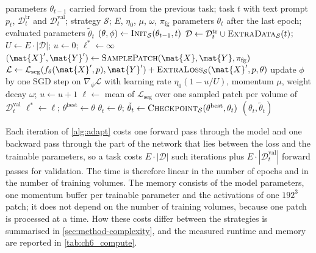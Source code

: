 \begin{algorithm}[tb]
\caption{\textsc{Adapt}: adapting VoxTell to task~$t$. The steps with subscript~$\mathcal{S}$ are where the strategies differ (\cref{sec:method-strategies}).}
\label{alg:adapt}
\begin{algorithmic}[1]
\REQUIRE parameters $\theta_{t-1}$ carried forward from the previous task; task $t$ with text prompt $p_t$, $\mathcal{D}_t^{\mathrm{tr}}$ and $\mathcal{D}_t^{\mathrm{val}}$; strategy $\mathcal{S}$; $E$, $\eta_0$, $\mu$, $\omega$, $\pi_{\mathrm{fg}}$
\ENSURE parameters $\theta_t$ after the last epoch; evaluated parameters $\tilde{\theta}_t$
\STATE $(\theta, \phi) \gets \textsc{Init}_{\mathcal{S}}(\theta_{t-1}, t)$ 
\STATE $\mathcal{D} \gets \mathcal{D}_t^{\mathrm{tr}} \cup \textsc{ExtraData}_{\mathcal{S}}(t)$; \quad $U \gets E \cdot |\mathcal{D}|$; \quad $u \gets 0$; \quad $\ell^{*} \gets \infty$
    \STATE $(\mat{X}', \mat{Y}') \gets \textsc{SamplePatch}(\mat{X}, \mat{Y}, \pi_{\mathrm{fg}})$
    \STATE $\mathcal{L} \gets \mathcal{L}_{\mathrm{seg}}(f_\theta(\mat{X}', p), \mat{Y}') + \textsc{ExtraLoss}_{\mathcal{S}}(\mat{X}', p, \theta)$
    \STATE update $\phi$ by one SGD step on $\nabla_\phi \mathcal{L}$ with learning rate $\eta_0 (1 - u/U)$, momentum $\mu$, weight decay $\omega$; \quad $u \gets u + 1$
  \ENDFOR
  \STATE $\ell \gets$ mean of $\mathcal{L}_{\mathrm{seg}}$ over one sampled patch per volume of $\mathcal{D}_t^{\mathrm{val}}$
  \IF{$\ell < \ell^{*}$}
    \STATE $\ell^{*} \gets \ell$; \quad $\theta^{\mathrm{best}} \gets \theta$
  \ENDIF
\ENDFOR
\STATE $\theta_t \gets \theta$; \quad $\tilde{\theta}_t \gets \textsc{Checkpoint}_{\mathcal{S}}(\theta^{\mathrm{best}}, \theta_t)$
\RETURN $(\theta_t, \tilde{\theta}_t)$
\end{algorithmic}
\end{algorithm}

Each iteration of \cref{alg:adapt} costs one forward pass through the model and one backward pass through the part of the network that lies between the loss and the trainable parameters, so a task costs $E \cdot |\mathcal{D}|$ such iterations plus $E \cdot |\mathcal{D}_t^{\mathrm{val}}|$ forward passes for validation.
The time is therefore linear in the number of epochs and in the number of training volumes.
The memory consists of the model parameters, one momentum buffer per trainable parameter and the activations of one $192^3$ patch; it does not depend on the number of training volumes, because one patch is processed at a time.
How these costs differ between the strategies is summarised in \cref{sec:method-complexity}, and the measured runtime and memory are reported in \cref{tab:ch6_compute}.

